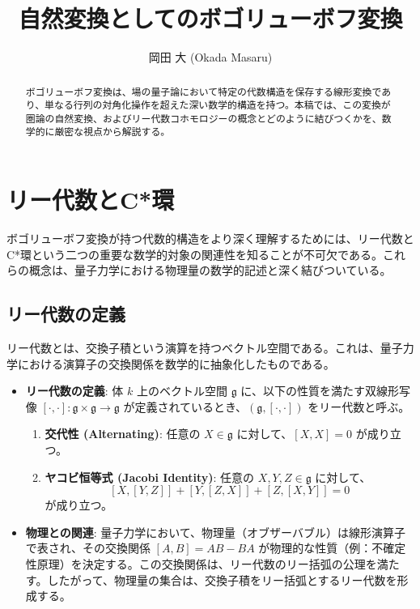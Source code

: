 \documentclass[uplatex,a4j,12pt,dvipdfmx]{jsarticle}
\title{
自然変換としてのボゴリューボフ変換
}
\author{
岡田 大 (Okada Masaru)
}
\begin{document}
\maketitle

\begin{abstract}
	ボゴリューボフ変換は、場の量子論において特定の代数構造を保存する線形変換であり、単なる行列の対角化操作を超えた深い数学的構造を持つ。本稿では、この変換が圏論の自然変換、およびリー代数コホモロジーの概念とどのように結びつくかを、数学的に厳密な視点から解説する。
\end{abstract}


\section{リー代数とC*環}

ボゴリューボフ変換が持つ代数的構造をより深く理解するためには、リー代数とC*環という二つの重要な数学的対象の関連性を知ることが不可欠である。これらの概念は、量子力学における物理量の数学的記述と深く結びついている。

\subsection{リー代数の定義}

リー代数とは、交換子積という演算を持つベクトル空間である。これは、量子力学における演算子の交換関係を数学的に抽象化したものである。

\begin{itemize}
	\item \textbf{リー代数の定義}:
	      体 $k$ 上のベクトル空間 $\mathfrak{g}$ に、以下の性質を満たす双線形写像 $[\cdot, \cdot]: \mathfrak{g} \times \mathfrak{g} \to \mathfrak{g}$ が定義されているとき、$(\mathfrak{g}, [\cdot, \cdot])$ をリー代数と呼ぶ。
	      \begin{enumerate}
		      \item \textbf{交代性 (Alternating)}: 任意の $X \in \mathfrak{g}$ に対して、$[X, X] = 0$ が成り立つ。
		      \item \textbf{ヤコビ恒等式 (Jacobi Identity)}: 任意の $X, Y, Z \in \mathfrak{g}$ に対して、
		            \[
			            [X, [Y, Z]] + [Y, [Z, X]] + [Z, [X, Y]] = 0
		            \]
		            が成り立つ。
	      \end{enumerate}
	\item \textbf{物理との関連}:
	      量子力学において、物理量（オブザーバブル）は線形演算子で表され、その交換関係 $[A, B] = AB - BA$ が物理的な性質（例：不確定性原理）を決定する。この交換関係は、リー代数のリー括弧の公理を満たす。したがって、物理量の集合は、交換子積をリー括弧とするリー代数を形成する。
\end{itemize}
\end{document}
